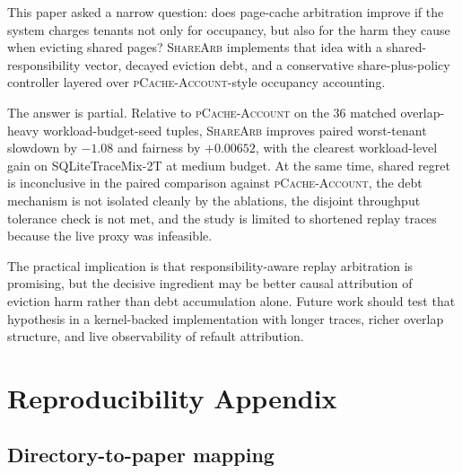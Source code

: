 \documentclass{article}
\newcommand{\sharearb}{\textsc{ShareArb}\xspace}
\newcommand{\pcache}{\textsc{pCache-Account}\xspace}
\begin{document}
This paper asked a narrow question: does page-cache arbitration improve if the system charges tenants not only for occupancy, but also for the harm they cause when evicting shared pages? \sharearb implements that idea with a shared-responsibility vector, decayed eviction debt, and a conservative share-plus-policy controller layered over \pcache-style occupancy accounting.

The answer is partial. Relative to \pcache on the 36 matched overlap-heavy workload-budget-seed tuples, \sharearb improves paired worst-tenant slowdown by $-1.08$ and fairness by $+0.00652$, with the clearest workload-level gain on SQLiteTraceMix-2T at medium budget. At the same time, shared regret is inconclusive in the paired comparison against \pcache, the debt mechanism is not isolated cleanly by the ablations, the disjoint throughput tolerance check is not met, and the study is limited to shortened replay traces because the live proxy was infeasible.

The practical implication is that responsibility-aware replay arbitration is promising, but the decisive ingredient may be better causal attribution of eviction harm rather than debt accumulation alone. Future work should test that hypothesis in a kernel-backed implementation with longer traces, richer overlap structure, and live observability of refault attribution.




\appendix

\section{Reproducibility Appendix}
\label{sec:appendix-repro}

\subsection{Directory-to-paper mapping}
\end{document}
